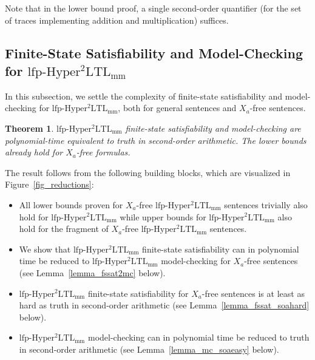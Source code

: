 \documentclass[dvipsnames,10pt,a4paper]{amsart}
\newtheorem{thm}{Theorem}[section]
\theoremstyle{definition}
\theoremstyle{remark}
\newcommand{\lfpsohyltlfp}{\mathrm{lfp\text{-}{Hyper^2LTL_{\mathrm{mm}}}}\xspace}
\newcommand{\univar}{X_a}
\begin{document}
Note that in the lower bound proof, a single second-order quantifier (for the set of traces implementing addition and multiplication) suffices. 

\subsection{\texorpdfstring{Finite-State Satisfiability and Model-Checking for \boldmath$\lfpsohyltlfp$}{Finite-State Satisfiability and Model-Checking for Second-order HyperLTL with Least Fixed Points}}

In this subsection, we settle the complexity of finite-state satisfiability and model-checking for $\lfpsohyltlfp$, both for general sentences and $\univar$-free sentences.

\begin{thm}
\label{thm_fssatmccomplexity_lfp}
$\lfpsohyltlfp$ finite-state satisfiability and model-checking are poly\-nomial-time equivalent to truth in second-order arithmetic. The lower bounds already hold for $\univar$-free formulas.
\end{thm}

The result follows from the following building blocks, which are visualized in Figure~\ref{fig_reductions}:

\begin{itemize}
    \item All lower bounds proven for $\univar$-free $\lfpsohyltlfp$ sentences trivially also hold for $\lfpsohyltlfp$ while upper bounds for $\lfpsohyltlfp$ also hold for the fragment of $\univar$-free $\lfpsohyltlfp$ sentences.
    \item We show that $\lfpsohyltlfp$ finite-state satisfiability can in polynomial time be reduced to $\lfpsohyltlfp$ model-checking for $\univar$-free sentences (see Lemma~\ref{lemma_fssat2mc} below).
    \item $\lfpsohyltlfp$ finite-state satisfiability for $\univar$-free sentences is at least as hard as truth in second-order arithmetic (see Lemma~\ref{lemma_fssat_soahard} below).
    \item $\lfpsohyltlfp$ model-checking can in polynomial time be reduced to truth in second-order arithmetic (see Lemma~\ref{lemma_mc_soaeasy} below).
\end{itemize}
\end{document}
